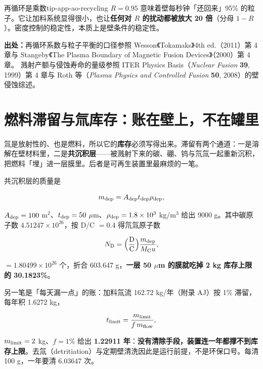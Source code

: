 \begin{tip}{再循环是乘数}{tip-app-ao-recycling}
$R=0.95$ 意味着壁每秒钟「还回来」95\% 的粒子。它让加料系统显得很小，也让\textbf{任何对 $R$ 的扰动都被放大 20 倍}（分母 $1-R$）。密度控制的稳定性，本质上是壁条件的稳定性。
\end{tip}

{\small

\textbf{出处：}再循环系数与粒子平衡的口径参照 Wesson《Tokamaks》4th ed.（2011）第 4 章与 Stangeby《The Plasma Boundary of Magnetic Fusion Devices》（2000）第 4 章。
溅射产额与侵蚀寿命的量级参照 ITER Physics Basis（\textit{Nuclear Fusion} \textbf{39}, 1999）第 4 章与 Roth 等（\textit{Plasma Physics and Controlled Fusion} \textbf{50}, 2008）的壁侵蚀综述。
}

\section{燃料滞留与氚库存：账在壁上，不在罐里}
\label{sec:app-ao-retention}

氚是放射性的、也是燃料，所以它的\textbf{库存}必须写得出来。滞留有两个通道：一是溶解在壁材料里，二是\textbf{共沉积层}——被溅射下来的碳、硼、钨与氘氚一起重新沉积，把燃料「埋」进一层膜里。后者是可再生装置里最麻烦的一笔。

共沉积层的质量是

\begin{equation}
m_{\rm dep}=A_{\rm dep}t_{\rm dep}\rho_{\rm dep},
\label{eq:app-ao-codep}
\end{equation}

$A_{\rm dep}=100$ m$^2$、$t_{\rm dep}=50$ $\mu$m、$\rho_{\rm dep}=1.8\times10^{3}$ kg/m$^3$ 给出 9000 g。其中碳原子数 $4.51247\times10^{26}$，按 D/C $=0.4$ 得氘氚原子数

\begin{equation}
N_{\rm D}=\Big(\frac{\rm D}{\rm C}\Big)\frac{m_{\rm dep}}{M_{\rm C}u},
\label{eq:app-ao-codepD}
\end{equation}

$=1.80499\times10^{26}$ 个，折合 603.647 g，\textbf{一层 50 $\mu$m 的膜就吃掉 2 kg 库存上限的 30.1823\%}。

另一笔是「每天漏一点」的账：加料氚流 162.72 kg/年（附录 AJ）按 1\% 滞留，每年积 1.6272 kg，

\begin{equation}
t_{\rm limit}=\frac{m_{\rm limit}}{f\,m_{\rm flow}},
\label{eq:app-ao-inventory}
\end{equation}

$m_{\rm limit}=2$ kg、$f=1\%$ 给出 \textbf{1.22911 年}：\textbf{没有清除手段，装置连一年都撑不到库存上限}。去氚（detritiation）与定期壁清洗因此是运行前提，不是环保口号。每清 100 g，一年要清 6.03647 次。

